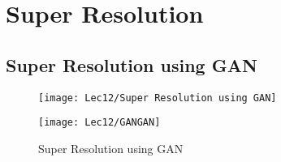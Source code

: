 \section{Super Resolution}

\subsection{Super Resolution using GAN}

\begin{figure}[H]
    \centering
    \texttt{[image: Lec12/Super Resolution using GAN]}
\end{figure}

\begin{figure}[H]
    \centering
    \texttt{[image: Lec12/GANGAN]}
    \caption{Super Resolution using GAN}
\end{figure}
